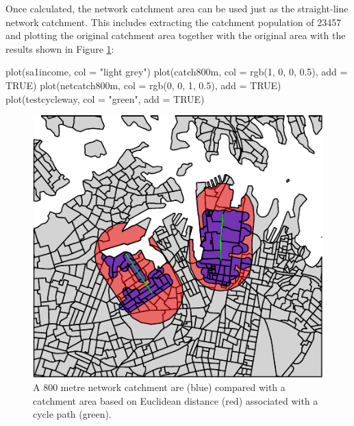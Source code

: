 Once calculated, the network catchment area can be used just as the
straight-line network catchment. This includes extracting the catchment
population of 23457 and plotting the original catchment area together
with the original area with the results shown in Figure
\ref{fig:netcatchplot}:

\begin{Schunk}
\begin{Sinput}
plot(sa1income, col = "light grey")
plot(catch800m, col = rgb(1, 0, 0, 0.5), add = TRUE)
plot(netcatch800m, col = rgb(0, 0, 1, 0.5), add = TRUE)
plot(testcycleway, col = "green", add = TRUE)
\end{Sinput}
\begin{figure}
\includegraphics[center]{netcatchplot-1} \caption[A 800 metre network catchment are (blue) compared with a catchment area based on Euclidean distance (red) associated with a cycle path (green)]{A 800 metre network catchment are (blue) compared with a catchment area based on Euclidean distance (red) associated with a cycle path (green).}\label{fig:netcatchplot}
\end{figure}
\end{Schunk}

